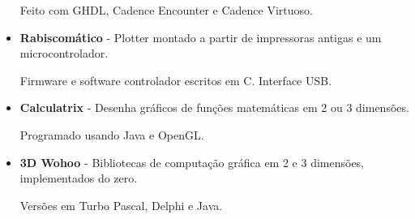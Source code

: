 \documentclass[a4paper,10pt]{article}
\begin{document}
\begin{itemize}
        Feito com GHDL, Cadence Encounter e Cadence Virtuoso.

      \item 
        \textbf{Rabiscomático} - Plotter montado a partir de impressoras antigas e um microcontrolador.

        Firmware e software controlador escritos em C. Interface USB.

      \item 
        \textbf{Calculatrix} - Desenha gráficos de funções matemáticas em 2 ou 3 dimensões.

        Programado usando Java e OpenGL.

      \item 
        \textbf{3D Wohoo} - Bibliotecas de computação gráfica em 2 e 3 dimensões, implementados do zero.

        Versões em Turbo Pascal, Delphi e Java.
    \end{itemize}
\end{document}
